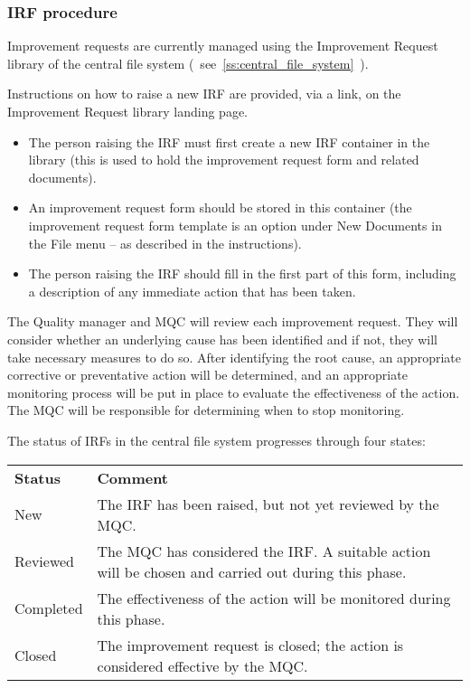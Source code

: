 \subsubsection{IRF procedure}
\label{sss:irf_procedure}
Improvement requests are currently managed using the Improvement Request library of the central file system (~see~\ref{ss:central_file_system}~). 

Instructions on how to raise a new IRF are provided, via a link, on the Improvement Request library landing page.
\begin{itemize} 
\item The person raising the IRF must first create a new IRF container in the library (this is used to hold the improvement request form and related documents). 
\item An improvement request form should be stored in this container (the improvement request form template is an option under New Documents in the File menu – as described in the instructions). 
\item The person raising the IRF should fill in the first part of this form, including a description of any immediate action that has been taken.
\end{itemize}

The Quality manager and MQC will review each improvement request. They will consider whether an underlying cause has been identified and if not, they will take necessary measures to do so. After identifying the root cause, an appropriate corrective or preventative action will be determined, and an appropriate monitoring process will be put in place to evaluate the effectiveness of the action.  The MQC will be responsible for determining when to stop monitoring.

The status of IRFs in the central file system progresses through four states:
\begin{center}
{\renewcommand*{\arraystretch}{1.4}
\begin{tabular}{p{14.07em}p{25em}}
	\rowcolor[rgb]{ 0,  0,  0} 
	\textcolor[rgb]{ 1,  1,  1}{\textbf{Status}} & 
	\textcolor[rgb]{ 1,  1,  1}{\textbf{Comment}} \\
New & The IRF has been raised, but not yet reviewed by the MQC. \\ 
Reviewed & The MQC has considered the IRF. A suitable action will be chosen and carried out during this phase. \\ 
Completed & The effectiveness of the action will be monitored during this phase. \\ 
Closed & The improvement request is closed; the action is considered effective by the MQC. \\ 
\hline 
\end{tabular} 
}
\end{center}

